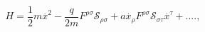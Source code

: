 \begin{equation}
H=\frac{1}{2}m\stackrel{.}{x}^{2}-\frac{q}{2m}F^{\rho \sigma }\mathcal{S}%
_{\rho \sigma }+a\stackrel{.}{x}_{\rho }F^{\rho \sigma }\mathcal{S}_{\sigma
\tau }\stackrel{.}{x}^{\tau }+....,
\end{equation}

